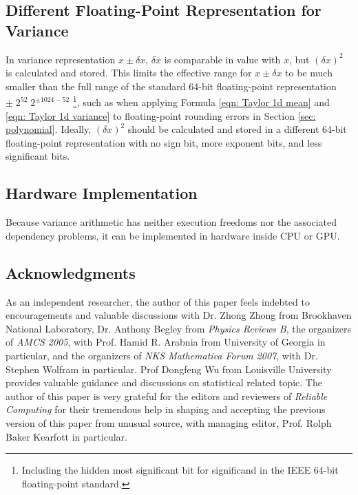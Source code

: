 \documentclass[twoside]{article}
\numberwithin{equation}{section}
\begin{document}
\subsection{Different Floating-Point Representation for Variance}

In variance representation $x \pm \delta x$, $\delta x$ is comparable in value with $x$, but $(\delta x)^2$ is calculated and stored.
This limits the effective range for $x \pm \delta x$ to be much smaller than the full range of the standard 64-bit floating-point representation $\pm\; 2^{52} \; 2^{\pm 1024 - 52}$ \footnote{Including the hidden most significant bit for significand in the IEEE 64-bit floating-point standard.}, such as when applying Formula \eqref{eqn: Taylor 1d mean} and \eqref{eqn: Taylor 1d variance} to floating-point rounding errors in Section \ref{sec: polynomial}.
Ideally, $(\delta x)^2$ should be calculated and stored in a different 64-bit floating-point representation with no sign bit, more exponent bits, and less significant bits.


\subsection{Hardware Implementation}

Because variance arithmetic has neither execution freedoms nor the associated dependency problems, it can be implemented in hardware inside CPU or GPU.



\subsection{Acknowledgments}

As an independent researcher, the author of this paper feels indebted to encouragements and valuable discussions with Dr. Zhong Zhong from Brookhaven National Laboratory, Dr. Anthony Begley from \emph{Physics Reviews B}, the organizers of \emph{AMCS 2005}, with Prof. Hamid R. Arabnia from University of Georgia in particular, and the organizers of \emph{NKS Mathematica Forum 2007}, with Dr. Stephen Wolfram in particular. 
Prof Dongfeng Wu from Louisville University provides valuable guidance and discussions on statistical related topic.
The author of this paper is very grateful for the editors and reviewers of \emph{Reliable Computing} for their tremendous help in shaping and accepting the previous version of this paper from unusual source, with managing editor, Prof. Rolph Baker Kearfott in particular.





\end{document}
